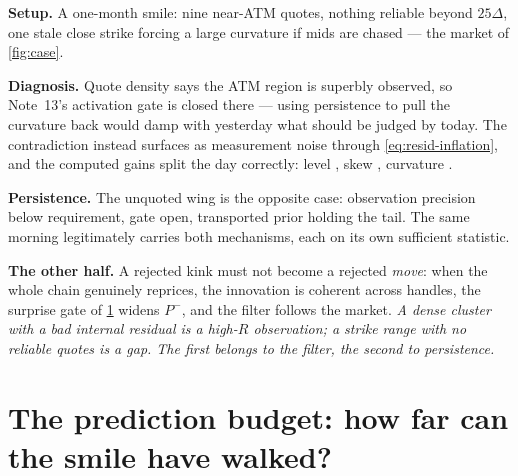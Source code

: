 \documentclass[11pt]{article}
\begin{document}
\begin{example}[title={Case file: close-strike contradiction versus true
gap}]
\textbf{Setup.}  A one-month smile: nine near-ATM quotes, nothing
reliable beyond $25\Delta$, one stale close strike forcing a large
curvature if mids are chased --- the market of \cref{fig:case}.

\textbf{Diagnosis.}  Quote density says the ATM region is superbly
observed, so Note~13's activation gate is closed there --- using
persistence to pull the curvature back would damp with yesterday what
should be judged by today.  The contradiction instead surfaces as
measurement noise through \cref{eq:resid-inflation}, and the computed
gains split the day correctly: level \ktrgainlevel, skew \ktrgainskew,
curvature \ktrgaincurv.

\textbf{Persistence.}  The unquoted wing is the opposite case:
observation precision below requirement, gate open, transported prior
holding the tail.  The same morning legitimately carries both
mechanisms, each on its own sufficient statistic.

\textbf{The other half.}  A rejected kink must not become a rejected
\emph{move}: when the whole chain genuinely reprices, the innovation is
coherent across handles, the surprise gate of \cref{sec:pbudget} widens
$P^-$, and the filter follows the market.  \emph{A dense cluster with a
bad internal residual is a high-$R$ observation; a strike range with no
reliable quotes is a gap.  The first belongs to the filter, the second
to persistence.}
\end{example}

\section{The prediction budget: how far can the smile have walked?}
\label{sec:pbudget}
\end{document}
